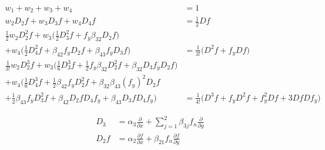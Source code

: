 \documentclass[12 pt]{article}
\begin{document}
\begin{align*}
	w_{1} + w_{2} + w_{3} + w_{4} &= 1\\
	w_{2}D_{2}f + w_{3}D_{3}f + w_{4}D_{4}f&= \frac{1}{2}Df\\
	\frac{1}{2}w_{2}D_{2}^{2}f + w_{3}\bigg(\frac{1}{2}D_{3}^{2}f + f_{y}\beta_{32}D_{2}f\bigg) & \\
	+ w_{4}\bigg(\frac{1}{2}D_{4}^{2}f + \beta_{42}f_{y}D_{2}f + \beta_{43}f_{y}D_{3}f\bigg) &= \frac{1}{3!}\bigg(D^{2}f+f_{y}Df\bigg)\\
	\frac{1}{3!}w_{2}D_{2}^{3}f + w_{3}\bigg(\frac{1}{6}D_{3}^{3}f + \frac{1}{2}f_{y}\beta_{32}D_{2}^{2}f + \beta_{32}D_{3}f_{y}D_{2}f\bigg) & \\
	+w_{4}\bigg(\frac{1}{6}D^{3}_{4}f + \frac{1}{2}\beta_{42}f_{y}D_{2}^{2}f+ \beta_{32}\beta_{43}(f_{y})^{2}D_{2}f & \\
	+ \frac{1}{2}\beta_{43}f_{y}D_{3}^{2}f + \beta_{42}D_{2}fD_{4}f_{y}	+ \beta_{43}D_{3}fD_{4}f_{y}\bigg) &= \frac{1}{4!}\bigg(D^{3}f + f_{y}D^{2}f + f_{y}^{2}Df + 3DfDf_{y}\bigg)
\end{align*}

\begin{align*}
	D_{3} &= \alpha_{3}\frac{\partial}{\partial x} + \sum_{j=1}^{2}\beta_{3j}f_{n}\frac{\partial}{\partial y}\\
	D_{2}f&= \alpha_{2}\frac{\partial f}{\partial x} + \beta_{21}f_{n}\frac{\partial f}{\partial y}
\end{align*}
\end{document}
